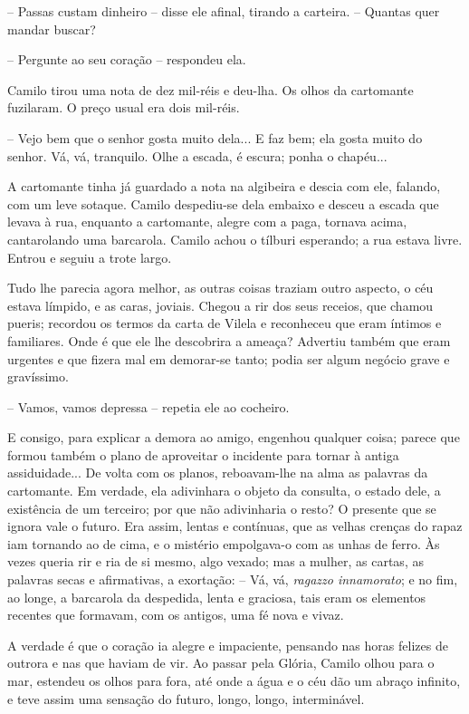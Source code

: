 -- Passas custam dinheiro -- disse ele afinal, tirando a carteira. --
Quantas quer mandar buscar?

-- Pergunte ao seu coração -- respondeu ela.

Camilo tirou uma nota de dez mil-réis e deu-lha. Os olhos da cartomante
fuzilaram. O preço usual era dois mil-réis.

-- Vejo bem que o senhor gosta muito dela... E faz bem; ela gosta muito
do senhor. Vá, vá, tranquilo. Olhe a escada, é escura; ponha o chapéu...

A cartomante tinha já guardado a nota na algibeira e descia com ele,
falando, com um leve sotaque. Camilo despediu-se dela embaixo e desceu a
escada que levava à rua, enquanto a cartomante, alegre com a paga,
tornava acima, cantarolando uma barcarola. Camilo achou o tílburi
esperando; a rua estava livre. Entrou e seguiu a trote largo.

Tudo lhe parecia agora melhor, as outras coisas traziam outro aspecto, o
céu estava límpido, e as caras, joviais. Chegou a rir dos seus receios,
que chamou pueris; recordou os termos da carta de Vilela e reconheceu
que eram íntimos e familiares. Onde é que ele lhe descobrira a ameaça?
Advertiu também que eram urgentes e que fizera mal em demorar-se tanto;
podia ser algum negócio grave e gravíssimo.

-- Vamos, vamos depressa -- repetia ele ao cocheiro.

E consigo, para explicar a demora ao amigo, engenhou qualquer coisa;
parece que formou também o plano de aproveitar o incidente para tornar à
antiga assiduidade... De volta com os planos, reboavam-lhe na alma as
palavras da cartomante. Em verdade, ela adivinhara o objeto da consulta,
o estado dele, a existência de um terceiro; por que não adivinharia o
resto? O presente que se ignora vale o futuro. Era assim, lentas e
contínuas, que as velhas crenças do rapaz iam tornando ao de cima, e o
mistério empolgava-o com as unhas de ferro. Às vezes queria rir e ria de
si mesmo, algo vexado; mas a mulher, as cartas, as palavras secas e
afirmativas, a exortação: -- Vá, vá, \emph{ragazzo innamorato}; e no
fim, ao longe, a barcarola da despedida, lenta e graciosa, tais eram os
elementos recentes que formavam, com os antigos, uma fé nova e vivaz.

A verdade é que o coração ia alegre e impaciente, pensando nas horas
felizes de outrora e nas que haviam de vir. Ao passar pela Glória,
Camilo olhou para o mar, estendeu os olhos para fora, até onde a água e
o céu dão um abraço infinito, e teve assim uma sensação do futuro,
longo, longo, interminável.

